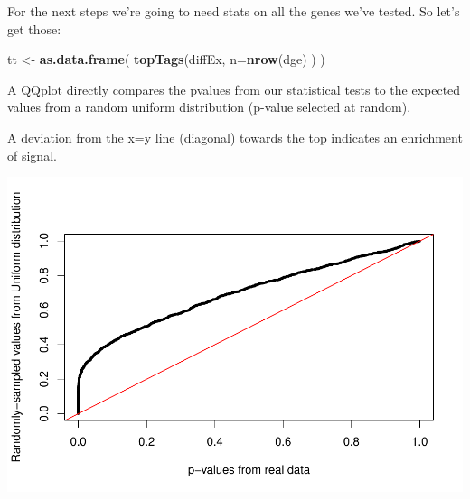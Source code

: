 \documentclass[
]{book}
\newenvironment{Shaded}{\begin{snugshade}}{\end{snugshade}}
\newcommand{\AttributeTok}[1]{\textcolor[rgb]{0.13,0.29,0.53}{#1}}
\newcommand{\CommentTok}[1]{\textcolor[rgb]{0.56,0.35,0.01}{\textit{#1}}}
\newcommand{\DecValTok}[1]{\textcolor[rgb]{0.00,0.00,0.81}{#1}}
\newcommand{\FloatTok}[1]{\textcolor[rgb]{0.00,0.00,0.81}{#1}}
\newcommand{\FunctionTok}[1]{\textcolor[rgb]{0.13,0.29,0.53}{\textbf{#1}}}
\newcommand{\NormalTok}[1]{#1}
\newcommand{\OtherTok}[1]{\textcolor[rgb]{0.56,0.35,0.01}{#1}}
\newcommand{\SpecialCharTok}[1]{\textcolor[rgb]{0.81,0.36,0.00}{\textbf{#1}}}
\newcommand{\StringTok}[1]{\textcolor[rgb]{0.31,0.60,0.02}{#1}}
\begin{document}
For the next steps we're going to need stats on all the genes we've tested. So let's get those:

\begin{Shaded}
\begin{Highlighting}[]
\NormalTok{tt }\OtherTok{\textless{}{-}} \FunctionTok{as.data.frame}\NormalTok{(}
    \FunctionTok{topTags}\NormalTok{(diffEx, }\AttributeTok{n=}\FunctionTok{nrow}\NormalTok{(dge)}
\NormalTok{    )}
\NormalTok{)}
\end{Highlighting}
\end{Shaded}

A QQplot directly compares the pvalues from our statistical tests to the expected values from a random uniform distribution (p-value selected at random).

A deviation from the x=y line (diagonal) towards the top indicates an enrichment of signal.

\begin{Shaded}
\end{Shaded}

\includegraphics{_main_files/figure-latex/unnamed-chunk-102-1.pdf}
\end{document}

